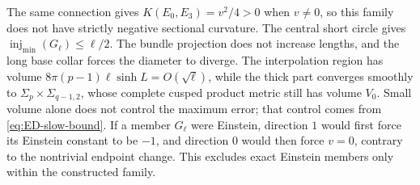 \documentclass[a4paper,11pt]{article}
\numberwithin{equation}{section}
\theoremstyle{definition}
\begin{document}
The same connection gives $K(E_0,E_3)=v^2/4>0$ when $v\ne0$,
so this family does not have strictly negative sectional curvature. The central short circle gives
$\operatorname{inj}_{\min}(G_\ell)\le\ell/2$.
The bundle projection does not increase lengths, and the long base collar forces the diameter to diverge.
The interpolation region has volume
$8\pi(p-1)\ell\sinh L=O(\sqrt\ell)$, while the thick part converges smoothly to
$\Sigma_p\times\Sigma_{q-1,2}$, whose complete cusped product metric still has volume $V_0$.
Small volume alone does not control the maximum error; that control comes from \eqref{eq:ED-slow-bound}.
If a member $G_\ell$ were Einstein, direction $1$ would first force its Einstein constant to be $-1$,
and direction $0$ would then force $v=0$, contrary to the nontrivial endpoint change.
This excludes exact Einstein members only within the constructed family.
\end{document}
